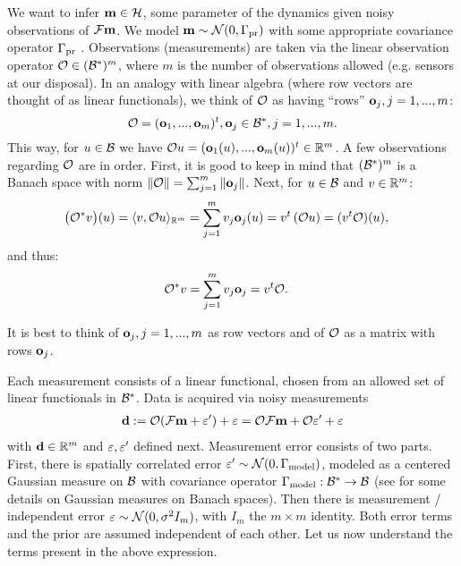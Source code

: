 \documentclass{amsart}
\numberwithin{equation}{section}
\begin{document}
We want to infer $\mathbf{m} \in \mathcal{H}$, some parameter of the dynamics
given noisy observations of $\mathcal{F} \mathbf{m}$. We model $\mathbf{m} \sim
\mathcal{N}(0,\Gamma_{\textup{pr}})$ with some appropriate covariance operator $\Gamma_{\textup{pr}}$
\cite{Stuart10}. Observations (measurements) are taken via the linear
observation operator $\mathcal{O} \in ( \mathcal{B}^* )^m$, where $m$ is the number
of observations allowed (e.g. sensors at our disposal). In an analogy
with linear algebra (where row vectors are thought of as linear
functionals), we think of $\mathcal{O}$ as having ``rows'' $\mathbf{o}_j,
j=1,...,m$:
\begin{equation}\label{eq:O}
  \mathcal{O} = (\mathbf{o}_1,..., \mathbf{o}_m)^t, \mathbf{o}_j \in \mathcal{B}^*, j = 1,...,m.
\end{equation}
This way, for $u \in \mathcal{B}$ we have $\mathcal{O} u = (\mathbf{o}_1(u), ...,
\mathbf{o}_m(u) )^t \in \mathbb{R}^m$.
A few observations regarding $\mathcal{O}$ are in order. First, it is good to
keep in mind that $( \mathcal{B}^* )^m$ is a Banach space with norm $\| \mathcal{O}
\| = \sum_{j=1}^m \|\mathbf{o}_j\|$. Next, for $u \in \mathcal{B}$ and $v\in
\mathbb{R}^m$:
\begin{align*}
  \big (\mathcal{O}^*v \big ) (u) &= \langle v, \mathcal{O} u \rangle_{\mathbb{R}^m} = \sum_{j=1}^m  v_j \mathbf{o}_j(u)
  = v^t \left ( \mathcal{O} u \right ) = (v^t \mathcal{O}) (u),
\end{align*}
and thus:
\begin{align}\label{eq:obs*}
  \mathcal{O}^*v &= \sum_{j=1}^m v_j \mathbf{o}_j = v^t \mathcal{O}.
\end{align}

\begin{observation}
  It is best to think of $\mathbf{o}_j,j=1,...,m$ as row vectors and of
  $\mathcal{O}$ as a matrix with rows $\mathbf{o}_j$. 
\end{observation}

Each measurement consists of a linear functional, chosen from an
allowed set of linear functionals in $\mathcal{B}^{*}$. Data is acquired via
noisy measurements
\begin{align*}
  \mathbf{d} := \mathcal{O} (\mathcal{F} \mathbf{m} + \varepsilon') + \varepsilon = \mathcal{O} \mathcal{F} \mathbf{m} + \mathcal{O} \varepsilon' + \varepsilon
\end{align*}
with $\mathbf{d} \in \mathbb{R}^m$ and $\varepsilon, \varepsilon'$ defined next. Measurement
error consists of two parts. First, there is spatially correlated
error $\varepsilon' \sim \mathcal{N}(0,\Gamma_{\textup{model}})$, modeled as a centered Gaussian
measure on $\mathcal{B}$ with covariance operator $\Gamma_{\textup{model}}: \mathcal{B}^* \to \mathcal{B}$
(see \cite[section 6]{Stuart10} for some details on Gaussian measures
on Banach spaces). Then there is measurement / independent error
$\varepsilon \sim \mathcal{N}(0, \sigma^2 I_m)$, with $I_m$ the $m \times m$
identity. Both error terms and the prior are assumed independent of
each other. Let us now understand the terms present in the above
expression.
\end{document}
